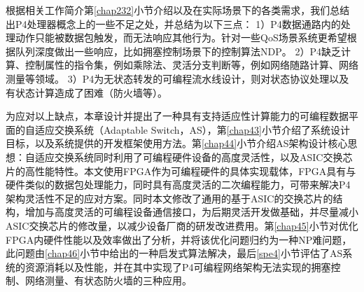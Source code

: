 根据相关工作简介第\ref{chap232}小节介绍以及在实际场景下的各类需求，我们总结出P4处理器概念上的一些不足之处，并总结为以下三点：
1）P4数据通路内的处理动作只能被数据包触发，而无法响应其他行为。针对一些QoS场景系统更希望根据队列深度做出一些响应，比如拥塞控制场景下的控制算法NDP。
2）P4缺乏计算、控制属性的指令集，例如乘除法、灵活分支判断等，例如网络随路计算、网络测量等领域。
3）P4为无状态转发的可编程流水线设计，则对状态协议处理以及有状态计算造成了困难（防火墙等）。

为应对以上缺点，本章设计并提出了一种具有支持适应性计算能力的可编程数据平面的自适应交换系统（Adaptable Switch，AS），第\ref{chap43}小节介绍了系统设计目标，以及系统提供的开发框架使用方法。第\ref{chap44}小节介绍AS架构设计核心思想：自适应交换系统同时利用了可编程硬件设备的高度灵活性，以及ASIC交换芯片的高性能特性。本文使用FPGA作为可编程硬件的具体实现载体，FPGA具有与硬件类似的数据包处理能力，同时具有高度灵活的二次编程能力，可带来解决P4架构灵活性不足的应对方案。同时本文修改了通用的基于ASIC的交换芯片的结构，增加与高度灵活的可编程设备通信接口，为后期灵活开发做基础，并尽量减小ASIC交换芯片的修改量，以减少设备厂商的研发改进费用。第\ref{chap45}小节对优化FPGA内硬件性能以及效率做出了分析，并将该优化问题归约为一种NP难问题，此问题由\ref{chap46}小节中给出的一种启发式算法解决，最后\ref{spe4}小节评估了AS系统的资源消耗以及性能，并在其中实现了P4可编程网络架构无法实现的拥塞控制、网络测量、有状态防火墙的三种应用。






